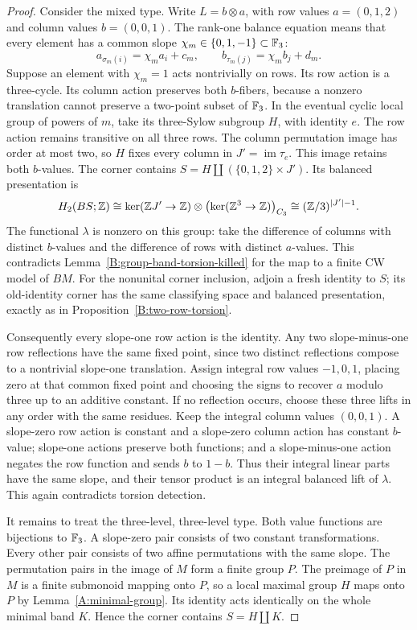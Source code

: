 \begin{proof}
Consider the mixed type. Write $L=b\otimes a$, with row values
$a=(0,1,2)$ and column values $b=(0,0,1)$. The rank-one balance
equation means that every element has a common slope
$\chi_m\in\{0,1,-1\}\subset\mathbb F_3$:
\[
 a_{\sigma_m(i)}=\chi_ma_i+c_m,\qquad
 b_{\tau_m(j)}=\chi_mb_j+d_m.
\]
Suppose an element with $\chi_m=1$ acts nontrivially on rows.
Its row action is a three-cycle. Its column action preserves both
$b$-fibers, because a nonzero translation cannot preserve a two-point
subset of $\mathbb F_3$. In the eventual cyclic local group of powers of
$m$, take its three-Sylow subgroup $H$, with identity $e$.
The row action remains transitive on all three rows. The column
permutation image has order at most two, so $H$ fixes every column
in $J'=\operatorname{im}\tau_e$. This image retains both $b$-values.
The corner contains
$S=H\amalg(\{0,1,2\}\times J')$. Its balanced presentation is
\[
 H_2(BS;\mathbb Z)
 \cong\ker(\mathbb Z J'\to\mathbb Z)\otimes
       \bigl(\ker(\mathbb Z^3\to\mathbb Z)\bigr)_{C_3}
 \cong(\mathbb Z/3)^{|J'|-1}.
\]
The functional $\lambda$ is nonzero on this group: take the
difference of columns with distinct $b$-values and the difference
of rows with distinct $a$-values. This contradicts
Lemma~\ref{B:group-band-torsion-killed} for the map to a finite CW
model of $BM$. For the nonunital corner inclusion, adjoin a fresh
identity to $S$; its old-identity corner has the same classifying
space and balanced presentation, exactly as in
Proposition~\ref{B:two-row-torsion}.

Consequently every slope-one row action is the identity. Any two
slope-minus-one row reflections have the same fixed point, since
two distinct reflections compose to a nontrivial slope-one
translation. Assign integral row values $-1,0,1$, placing zero at
that common fixed point and choosing the signs to recover $a$
modulo three up to an additive constant. If no reflection occurs,
choose these three lifts in any order with the same residues.
Keep the integral column values $(0,0,1)$. A slope-zero row action
is constant and a slope-zero column action has constant $b$-value;
slope-one actions preserve both functions; and a slope-minus-one
action negates the row function and sends $b$ to $1-b$.
Thus their integral linear parts have the same slope, and their
tensor product is an integral balanced lift of $\lambda$.
This again contradicts torsion detection.

It remains to treat the three-level, three-level type. Both value
functions are bijections to $\mathbb F_3$. A slope-zero pair consists of
two constant transformations. Every other pair consists of two
affine permutations with the same slope. The permutation pairs in
the image of $M$ form a finite group $P$. The preimage of $P$ in
$M$ is a finite submonoid mapping onto $P$, so a local maximal
group $H$ maps onto $P$ by Lemma~\ref{A:minimal-group}. Its identity
acts identically on the whole minimal band $K$. Hence the corner
contains $S=H\amalg K$.


\end{proof}
